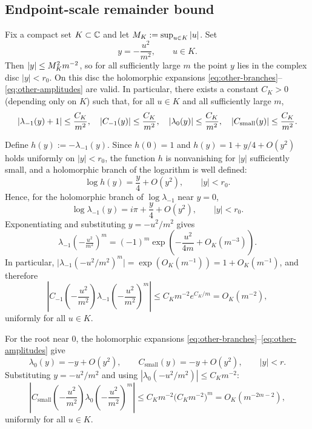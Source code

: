 \subsection{Endpoint-scale remainder bound}

Fix a compact set \(K\subset\mathbb{C}\) and let \(M_K:=\sup_{u\in K}\left\lvert u\right\rvert\).
Set
\[
y=-\frac{u^2}{m^2},
\qquad u\in K.
\]
Then \(\left\lvert y\right\rvert\le M_K^2m^{-2}\), so for all sufficiently large \(m\) the point \(y\) lies in the complex disc \(|y|<r_0\).
On this disc the holomorphic expansions \eqref{eq:other-branches}--\eqref{eq:other-amplitudes} are valid.
In particular, there exists a constant \(C_K>0\) (depending only on \(K\)) such that, for all \(u\in K\) and all sufficiently large \(m\),
\begin{equation}\label{eq:y-bound}
\left\lvert \lambda_{-1}(y)+1\right\rvert\le \frac{C_K}{m^2},
\quad
\left\lvert C_{-1}(y)\right\rvert\le \frac{C_K}{m^2},
\quad
\left\lvert \lambda_0(y)\right\rvert\le \frac{C_K}{m^2},
\quad
\left\lvert C_{\mathrm{small}}(y)\right\rvert\le \frac{C_K}{m^2}.
\end{equation}

Define \(h(y):=-\lambda_{-1}(y)\).
Since \(h(0)=1\) and \(h(y)=1+y/4+O(y^2)\) holds uniformly on \(|y|<r_0\), the function \(h\) is nonvanishing for \(|y|\) sufficiently small, and a holomorphic branch of the logarithm is well defined:
\[
\log h(y)=\frac{y}{4}+O(y^2),
\qquad |y|<r_0.
\]
Hence, for the holomorphic branch of \(\log\lambda_{-1}\) near \(y=0\),
\begin{equation}\label{eq:log-lambda-minus-one}
\log \lambda_{-1}(y)=i\pi+\frac{y}{4}+O(y^2),
\qquad |y|<r_0.
\end{equation}
Exponentiating and substituting \(y=-u^2/m^2\) gives
\[
\lambda_{-1}\!\left(-\tfrac{u^2}{m^2}\right)^m
=
(-1)^m\exp\!\left(-\frac{u^2}{4m}+O_K(m^{-3})\right).
\]
In particular, \(\bigl|\lambda_{-1}(-u^2/m^2)^m\bigr|=\exp(O_K(m^{-1}))=1+O_K(m^{-1})\), and therefore
\begin{equation}\label{eq:minus-one-contribution-bound}
\left|
C_{-1}\!\left(-\frac{u^2}{m^2}\right)
\lambda_{-1}\!\left(-\frac{u^2}{m^2}\right)^m
\right|
\le C_K m^{-2}e^{C_K/m}
=
O_K(m^{-2}),
\end{equation}
uniformly for all $u\in K$.

For the root near \(0\), the holomorphic expansions \eqref{eq:other-branches}--\eqref{eq:other-amplitudes} give
\[
\lambda_0(y)=-y+O(y^2),
\qquad
C_{\mathrm{small}}(y)=-y+O(y^2),
\qquad |y|<r.
\]
Substituting \(y=-u^2/m^2\) and using $|\lambda_0(-u^2/m^2)|\le C_K m^{-2}$:
\begin{equation}\label{eq:small-root-contribution-bound}
\left|
C_{\mathrm{small}}\!\left(-\frac{u^2}{m^2}\right)
\lambda_0\!\left(-\frac{u^2}{m^2}\right)^m
\right|
\le
C_K m^{-2}\bigl(C_K m^{-2}\bigr)^m
=
O_K(m^{-2m-2}),
\end{equation}
uniformly for all $u\in K$.

